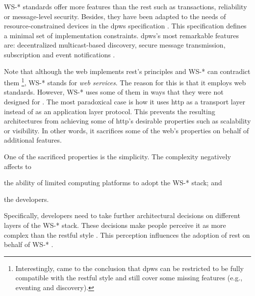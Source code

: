 WS-* standards offer more features than the \ac{rest} such as transactions, reliability or message-level security.
Besides, they have been adapted to the needs of resource-constrained devices in the \ac{dpws} specification .
This specification defines a minimal set of implementation constraints.
\ac{dpws}'s most remarkable features are: decentralized multicast-based discovery, secure message transmission, subscription and event notifications \citep{moritz_devices_2010}.


Note that although the web implements \ac{rest}'s principles and WS-* can contradict them
\footnote{Interestingly, \citet{moritz_devices_2010} came to the conclusion that \ac{dpws} can be restricted to be fully compatible with the \ac{rest}ful style and still cover some missing features (e.g., eventing and discovery).},
WS-* stands for \emph{web services}. %
The reason for this is that it employs web standards. %
However, WS-* uses some of them in ways that they were not designed for \citep{krummenacher_www_2005}.
The most paradoxical case is how it uses \ac{http} as a transport layer instead of as an application layer protocol.
This prevents the resulting architectures from achieving some of \ac{http}'s desirable properties such as scalability or visibility.
In other words, it sacrifices some of the web's properties on behalf of additional features.


One of the sacrificed properties is the simplicity.
The complexity negatively affects to
\begin{enumerate*}[label=\itshape(\arabic*\upshape)]
  \item the ability of limited computing platforms to adopt the WS-* stack; and %
  \item the developers.
\end{enumerate*}
Specifically, developers need to take further architectural decisions on different layers of the WS-* stack.
These decisions make people perceive it as more complex than the \ac{rest}ful style \citep{guinard_search_2011}.
This perception influences the adoption of \ac{rest} on behalf of WS-* \citep{davis_perceived_1989,legris_why_2003}.


